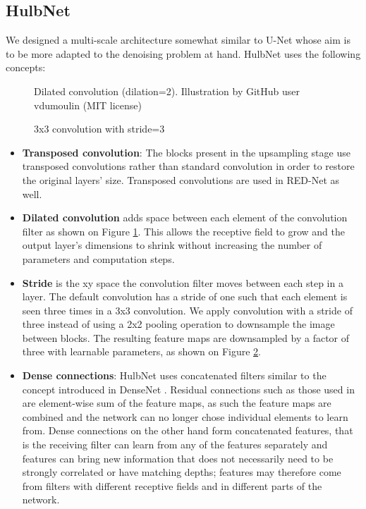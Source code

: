 \subsection{HulbNet}
We designed a multi-scale architecture somewhat similar to U-Net whose aim is to be more adapted to the denoising problem at hand. HulbNet uses the following concepts:
\begin{figure}
  \begin{center}
    \caption[Dilated convolution]{Dilated convolution (dilation=2). Illustration by GitHub user vdumoulin (MIT license)}
    \label{fig:dilated}
  \end{center}
\end{figure}
\begin{figure}
  \begin{center}
      
    \caption[Strided convolution]{3x3 convolution with stride=3}
    \label{fig:str3}
  \end{center}
\end{figure}
\begin{itemize}
  \item \textbf{Transposed convolution}: The blocks present in the upsampling stage use transposed convolutions rather than standard convolution in order to restore the original layers' size. Transposed convolutions are used in RED-Net as well.
  \item \textbf{Dilated convolution} adds space between each element of the convolution filter as shown on Figure \ref{fig:dilated}. This allows the receptive field to grow and the output layer's dimensions to shrink without increasing the number of parameters and computation steps.
  \item \textbf{Stride} is the xy space the convolution filter moves between each step in a layer. The default convolution has a stride of one such that each element is seen three times in a 3x3 convolution. We apply convolution with a stride of three instead of using a 2x2 pooling operation to downsample the image between blocks. The resulting feature maps are downsampled by a factor of three with learnable parameters, as shown on Figure \ref{fig:str3}.
  \item \textbf{Dense connections}: HulbNet uses concatenated filters similar to the concept introduced in DenseNet \cite{densenet}. Residual connections such as those used in \cite{rednet}\cite{unet} are element-wise sum of the feature maps, as such the feature maps are combined and the network can no longer chose individual elements to learn from. Dense connections on the other hand form concatenated features, that is the receiving filter can learn from any of the features separately and features can bring new information that does not necessarily need to be strongly correlated or have matching depths; features may therefore come from filters with different receptive fields and in different parts of the network.
\end{itemize}
